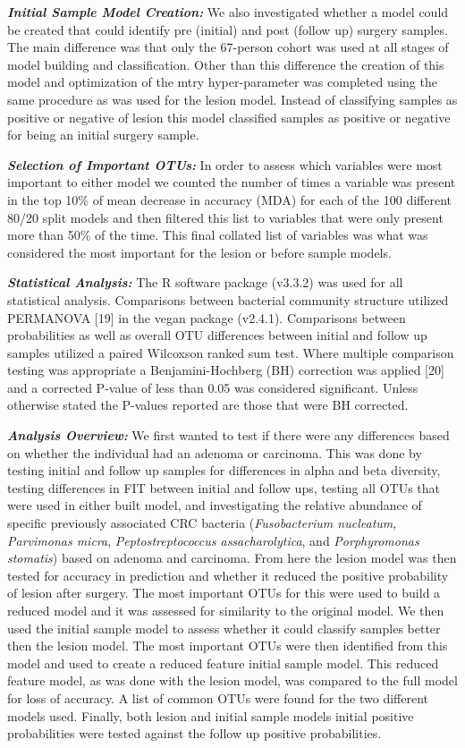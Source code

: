 \documentclass[12pt,]{article}
\begin{document}
\textbf{\emph{Initial Sample Model Creation:}} We also investigated
whether a model could be created that could identify pre (initial) and
post (follow up) surgery samples. The main difference was that only the
67-person cohort was used at all stages of model building and
classification. Other than this difference the creation of this model
and optimization of the mtry hyper-parameter was completed using the
same procedure as was used for the lesion model. Instead of classifying
samples as positive or negative of lesion this model classified samples
as positive or negative for being an initial surgery sample.

\textbf{\emph{Selection of Important OTUs:}} In order to assess which
variables were most important to either model we counted the number of
times a variable was present in the top 10\% of mean decrease in
accuracy (MDA) for each of the 100 different 80/20 split models and then
filtered this list to variables that were only present more than 50\% of
the time. This final collated list of variables was what was considered
the most important for the lesion or before sample models.

\textbf{\emph{Statistical Analysis:}} The R software package (v3.3.2)
was used for all statistical analysis. Comparisons between bacterial
community structure utilized PERMANOVA {[}19{]} in the vegan package
(v2.4.1). Comparisons between probabilities as well as overall OTU
differences between initial and follow up samples utilized a paired
Wilcoxson ranked sum test. Where multiple comparison testing was
appropriate a Benjamini-Hochberg (BH) correction was applied {[}20{]}
and a corrected P-value of less than 0.05 was considered significant.
Unless otherwise stated the P-values reported are those that were BH
corrected.

\textbf{\emph{Analysis Overview:}} We first wanted to test if there were
any differences based on whether the individual had an adenoma or
carcinoma. This was done by testing initial and follow up samples for
differences in alpha and beta diversity, testing differences in FIT
between initial and follow ups, testing all OTUs that were used in
either built model, and investigating the relative abundance of specific
previously associated CRC bacteria (\emph{Fusobacterium nucleatum},
\emph{Parvimonas micra}, \emph{Peptostreptococcus assacharolytica}, and
\emph{Porphyromonas stomatis}) based on adenoma and carcinoma. From here
the lesion model was then tested for accuracy in prediction and whether
it reduced the positive probability of lesion after surgery. The most
important OTUs for this were used to build a reduced model and it was
assessed for similarity to the original model. We then used the initial
sample model to assess whether it could classify samples better then the
lesion model. The most important OTUs were then identified from this
model and used to create a reduced feature initial sample model. This
reduced feature model, as was done with the lesion model, was compared
to the full model for loss of accuracy. A list of common OTUs were found
for the two different models used. Finally, both lesion and initial
sample models initial positive probabilities were tested against the
follow up positive probabilities.
\end{document}
